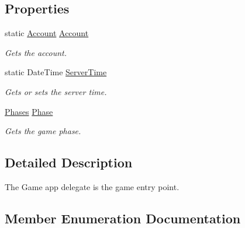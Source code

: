 \subsection*{Properties}
\begin{DoxyCompactItemize}
\item 
static \hyperlink{classCore_1_1Models_1_1Account}{Account} \hyperlink{classClient_1_1Common_1_1GameAppDelegate_aa626869ffdd0e3f8f46ab069bc24f0d1}{Account}
\begin{DoxyCompactList}\small\item\em Gets the account. \end{DoxyCompactList}\item 
static Date\+Time \hyperlink{classClient_1_1Common_1_1GameAppDelegate_a53f8c229a2501eb9ae1fcb1c297ef406}{Server\+Time}
\begin{DoxyCompactList}\small\item\em Gets or sets the server time. \end{DoxyCompactList}\item 
\hyperlink{classClient_1_1Common_1_1GameAppDelegate_aa0175b28b3986f7cf57680f07558ab3c}{Phases} \hyperlink{classClient_1_1Common_1_1GameAppDelegate_a2fb6f0fd7533c38a555760efd3ea896b}{Phase}
\begin{DoxyCompactList}\small\item\em Gets the game phase. \end{DoxyCompactList}\end{DoxyCompactItemize}


\subsection{Detailed Description}
The Game app delegate is the game entry point. 



\subsection{Member Enumeration Documentation}
\hypertarget{classClient_1_1Common_1_1GameAppDelegate_aa0175b28b3986f7cf57680f07558ab3c}{}
